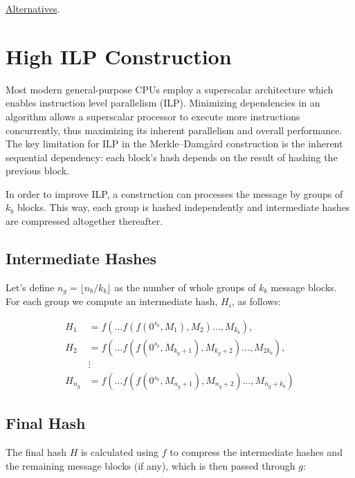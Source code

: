 \documentclass[11pt]{article}
\begin{document}
\href{https://www.researchgate.net/publication/322094216_Merkle-Damgard_Construction_Method_and_Alternatives_A_Review}{Alternatives}.

\section{High ILP Construction} \label{highilp}

Most modern general-purpose CPUs employ a superscalar architecture which enables instruction level parallelism (ILP). 
Minimizing dependencies in an algorithm allows a superscalar processor to execute more instructions concurrently, thus maximizing its inherent parallelism and overall performance.
The key limitation for ILP in the Merkle–Damgård construction is the inherent sequential dependency: each block's hash depends on the result of hashing the previous block.

In order to improve ILP, a construction can processes the message by groups of \( k_b \) blocks. This way, each group is hashed independently and intermediate hashes are compressed altogether thereafter.

\subsection{Intermediate Hashes}

Let's define \( n_g = \lfloor {n_b}/{k_b} \rfloor \) as the number of whole groups of \( k_b \) message blocks. \\
For each group we compute an intermediate hash, \( H_i \), as follows:

\begin{align*}
H_{1} &= f(\ldots f(f(0^{s_b}, M_1), M_2)\ldots, M_{k_b}), \\
H_{2} &= f(\ldots f(f(0^{s_b}, M_{k_g+1}), M_{k_g+2})\ldots, M_{2k_b}), \\
&\vdots \\
H_{n_g} &= f(\ldots f(f(0^{s_b}, M_{n_g+1}), M_{n_g+2})\ldots, M_{n_g+k_b})
\end{align*}

\subsection{Final Hash}

The final hash \( H \) is calculated using \( f \) to compress the intermediate hashes and the remaining message blocks (if any), which is then passed through \( g \):
\end{document}
